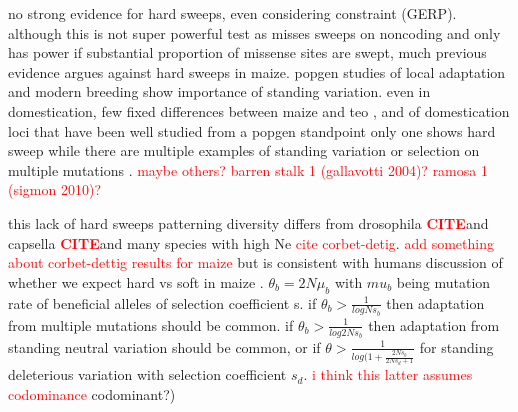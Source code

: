 \documentclass{pnastwo}
\newcommand{\jri}[1]{\textcolor{red}{\scriptsize #1}}
\newcommand{\citex}{\textcolor{red}{\bf CITE}}
\begin{document}
\begin{article}
\color{blue}

no strong evidence for hard sweeps, even considering constraint (GERP).
although this is not super powerful test as misses sweeps on noncoding and only has power if substantial proportion of missense sites are swept, much previous evidence argues against hard sweeps in maize.  
popgen studies of local adaptation \cite{Takuno15062015} and modern breeding \cite{beissinger2014} show importance of standing variation. 
even in domestication, few fixed differences between maize and teo \cite{hufford2012}, and of domestication loci that have been well studied from a popgen standpoint only one shows hard sweep \cite{wang2015} while there are multiple examples of standing variation \cite{studer2011, wills2013} or selection on multiple mutations \cite{wills2013}. \jri{maybe others? barren stalk 1 (gallavotti 2004)? ramosa 1 (sigmon 2010)? }

this lack of hard sweeps patterning diversity differs from drosophila \citex and capsella \citex and many species with high Ne \jri{cite corbet-detig}. \jri{add something about corbet-dettig results for maize}
but is consistent with humans \cite{hernandez2011}
discussion of whether we expect hard vs soft in maize \cite{messer2013population}.
$\theta_b = 2N\mu_b$ with $mu_b$ being mutation rate of beneficial alleles of selection coefficient s. 
if $\theta_b > \frac{1}{log{Ns_b}}$ then adaptation from multiple mutations should be common. 
if  $\theta_b > \frac{1}{log{2Ns_b}}$ then adaptation from standing neutral variation should be common, or if $\theta > \frac{1}{log(1+\frac{2Ns_b}{2Ns_d + 1}}$ for standing deleterious variation with selection coefficient $s_d$. \jri{i think this latter assumes codominance} codominant?) 



\end{article}
\end{document}

